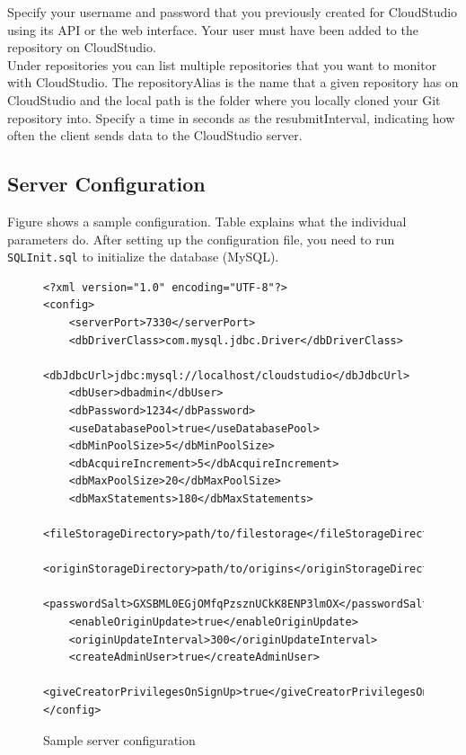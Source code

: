 Specify your username and password that you previously created for CloudStudio using its API or the web interface. Your user must have been added to the repository on CloudStudio. \\

Under repositories you can list multiple repositories that you want to monitor with CloudStudio. The repositoryAlias is the name that a given repository has on CloudStudio and the local path is the folder where you locally cloned your Git repository into. Specify a time in seconds as the resubmitInterval, indicating how often the client sends data to the CloudStudio server.


\subsection{Server Configuration}

Figure \cite{fig:serverconfig} shows a sample configuration. Table \cite{fig:serverconfigtable} explains what the individual parameters do. After setting up the configuration file, you need to run \texttt{SQLInit.sql} to initialize the database (MySQL).

\begin{figure}[h!]
\begin{lstlisting}
<?xml version="1.0" encoding="UTF-8"?>
<config>
    <serverPort>7330</serverPort>
    <dbDriverClass>com.mysql.jdbc.Driver</dbDriverClass>
    <dbJdbcUrl>jdbc:mysql://localhost/cloudstudio</dbJdbcUrl>
    <dbUser>dbadmin</dbUser>
    <dbPassword>1234</dbPassword>
    <useDatabasePool>true</useDatabasePool>
    <dbMinPoolSize>5</dbMinPoolSize>
    <dbAcquireIncrement>5</dbAcquireIncrement>
    <dbMaxPoolSize>20</dbMaxPoolSize>
    <dbMaxStatements>180</dbMaxStatements>
    <fileStorageDirectory>path/to/filestorage</fileStorageDirectory>
    <originStorageDirectory>path/to/origins</originStorageDirectory>
    <passwordSalt>GXSBML0EGjOMfqPzsznUCkK8ENP3lmOX</passwordSalt>
    <enableOriginUpdate>true</enableOriginUpdate>
    <originUpdateInterval>300</originUpdateInterval>
    <createAdminUser>true</createAdminUser>
    <giveCreatorPrivilegesOnSignUp>true</giveCreatorPrivilegesOnSignUp>
</config>
\end{lstlisting}
  \centering
  \caption{Sample server configuration}
  \label{fig:serverconfig}
\end{figure}


